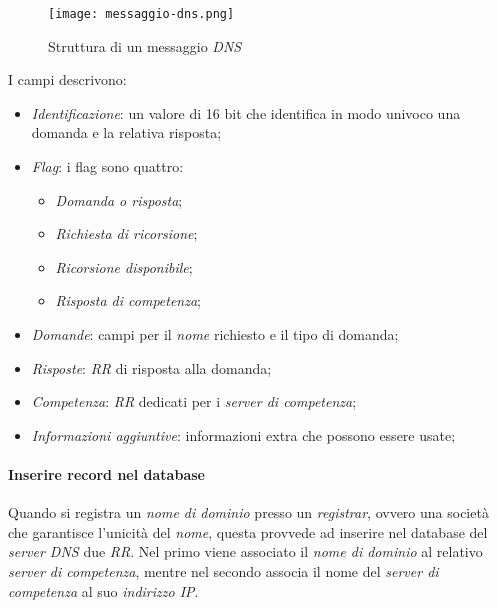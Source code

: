 \newpage
\begin{figure}[ht]
    \centering
    \texttt{[image: messaggio-dns.png]}
    \caption{Struttura di un messaggio \emph{DNS}}
\end{figure}\noindent
I campi descrivono:
\begin{itemize}
    \item \emph{Identificazione}: un valore di 16 bit che identifica in modo
    univoco una domanda e la relativa risposta;
    \item \emph{Flag}: i flag sono quattro:
    \begin{itemize}
        \item \emph{Domanda o risposta};
        \item \emph{Richiesta di ricorsione};
        \item \emph{Ricorsione disponibile};
        \item \emph{Risposta di competenza};
    \end{itemize}
    \item \emph{Domande}: campi per il \emph{nome} richiesto e il tipo di domanda;
    \item \emph{Risposte}: \emph{RR} di risposta alla domanda;
    \item \emph{Competenza}: \emph{RR} dedicati per i \emph{server di competenza};
    \item \emph{Informazioni aggiuntive}: informazioni extra che possono essere
    usate;
\end{itemize}

\paragraph{Inserire record nel database}
Quando si registra un \emph{nome di dominio} presso un \emph{registrar}, ovvero
una società che garantisce l'unicità del \emph{nome}, questa provvede ad inserire
nel database del \emph{server DNS} due \emph{RR}. Nel primo viene associato il
\emph{nome di dominio} al relativo \emph{server di competenza}, mentre nel
secondo associa il nome del \emph{server di competenza} al suo \emph{indirizzo IP}.